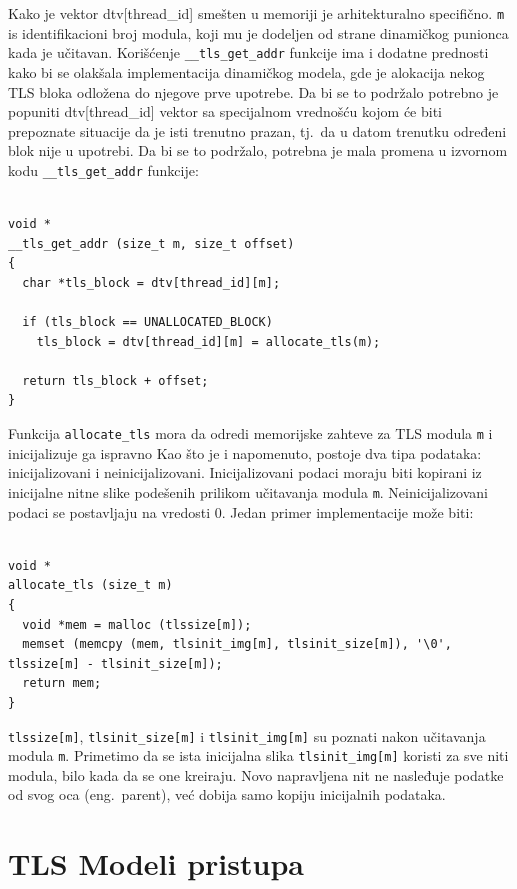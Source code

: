 \documentclass[12pt,oneside]{memoir}
\begin{document}
Kako je vektor dtv[thread\_id] smešten u memoriji je arhitekturalno specifično. \texttt{m} is identifikacioni broj modula, koji mu je dodeljen od strane dinamičkog punionca kada je učitavan. Korišćenje \texttt{\_\_tls\_get\_addr} funkcije ima i dodatne prednosti kako bi se olakšala implementacija dinamičkog modela, gde je alokacija nekog TLS bloka odložena do njegove prve upotrebe. Da bi se to podržalo potrebno je popuniti dtv[thread\_id] vektor sa specijalnom vrednošću kojom će biti prepoznate situacije da je isti trenutno prazan, tj.~da u datom trenutku određeni blok nije u upotrebi. Da bi se to podržalo, potrebna je mala promena u izvornom kodu \texttt{\_\_tls\_get\_addr} funkcije:

\begin{lstlisting}

void *
__tls_get_addr (size_t m, size_t offset)
{
  char *tls_block = dtv[thread_id][m];

  if (tls_block == UNALLOCATED_BLOCK)
    tls_block = dtv[thread_id][m] = allocate_tls(m);

  return tls_block + offset;
}

\end{lstlisting}

Funkcija \texttt{allocate\_tls} mora da odredi memorijske zahteve za TLS modula \texttt{m} i inicijalizuje ga ispravno Kao što je i napomenuto, postoje dva tipa podataka: inicijalizovani i neinicijalizovani. Inicijalizovani podaci moraju biti kopirani iz inicijalne nitne slike podešenih prilikom učitavanja modula \texttt{m}. Neinicijalizovani podaci se postavljaju na vredosti 0. Jedan primer implementacije može biti:

\begin{lstlisting}

void *
allocate_tls (size_t m)
{
  void *mem = malloc (tlssize[m]);
  memset (memcpy (mem, tlsinit_img[m], tlsinit_size[m]), '\0', tlssize[m] - tlsinit_size[m]);
  return mem;
}

\end{lstlisting}

\texttt{tlssize[m]}, \texttt{tlsinit\_size[m]} i \texttt{tlsinit\_img[m]} su poznati nakon učitavanja modula \texttt{m}. Primetimo da se ista inicijalna slika \texttt{tlsinit\_img[m]} koristi za sve niti modula, bilo kada da se one kreiraju. Novo napravljena nit ne nasleđuje podatke od svog oca (eng.~parent), već dobija samo kopiju inicijalnih podataka.

\section{TLS Modeli pristupa}
\end{document}
